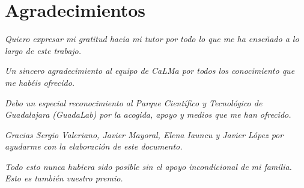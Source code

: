 \chapter*{Agradecimientos}  %
\vspace{5mm}
\textit{
Quiero expresar mi gratitud hacia mi tutor por todo lo que me ha enseñado a lo largo de este trabajo.}
	\par
	\vspace{5mm}
\textit{
Un sincero agradecimiento al equipo de CaLMa por todos los conocimiento que me habéis ofrecido.}
	\par 
	\vspace{5mm}
\textit{
Debo un especial reconocimiento  al Parque Científico y Tecnológico de Guadalajara (GuadaLab) por la acogida, apoyo y medios que me han ofrecido.}
	\par
	\vspace{5mm}
\textit{
Gracias Sergio Valeriano, Javier Mayoral, Elena Iauncu y Javier López por ayudarme con la elaboración de este documento.}
	\par
	\vspace{5mm}
\textit{
Todo esto nunca hubiera sido posible sin el apoyo incondicional de mi familia. Esto es también vuestro premio.}

